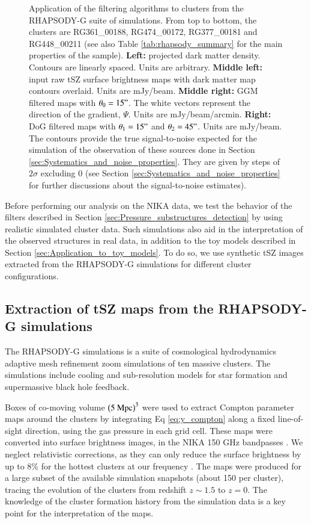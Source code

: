 \documentclass[twocolumn,traditabstract]{aa}
\begin{document}
\begin{figure}[h]
\caption{\footnotesize{Application of the filtering algorithms to clusters from the RHAPSODY-G suite of simulations. From top to bottom, the clusters are RG361\_00188, RG474\_00172, RG377\_00181 and RG448\_00211 (see also Table \ref{tab:rhapsody_summary} for the main properties of the sample). {\bf Left:} projected dark matter density. Contours are linearly spaced. Units are arbitrary. {\bf Middle left:} input raw tSZ surface brightness maps with dark matter map contours overlaid. Units are mJy/beam. {\bf Middle right:} GGM filtered maps with $\theta_0 = 15"$. The white vectors represent the direction of the gradient, $\Psi$. Units are mJy/beam/arcmin. {\bf Right:} DoG filtered maps with $\theta_1 = 15"$ and $\theta_2 = 45"$. Units are mJy/beam. The contours provide the true signal-to-noise expected for the simulation of the observation of these sources done in Section \ref{sec:Systematics_and_noise_properties}. They are given by steps of $2 \sigma$ excluding 0 (see Section \ref{sec:Systematics_and_noise_properties} for further discussions about the signal-to-noise estimates).}}
\label{fig:RG_cluster_sample}
\end{figure}

Before performing our analysis on the NIKA data, we test the behavior of the filters described in Section \ref{sec:Pressure_substructures_detection} by using realistic simulated cluster data. Such simulations also aid in the interpretation of the observed structures in real data, in addition to the toy models described in Section \ref{sec:Application_to_toy_models}. To do so, we use synthetic tSZ images extracted from the RHAPSODY-G simulations for different cluster configurations.

\subsection{Extraction of tSZ maps from the RHAPSODY-G simulations}
The RHAPSODY-G simulations \citep{Wu2013,Hahn2017} is a suite of cosmological hydrodynamics adaptive mesh refinement zoom simulations of ten massive clusters. The simulations include cooling and sub-resolution models for star formation and supermassive black hole feedback. 

Boxes of co-moving volume $\left(5 \ {\rm Mpc}\right)^3$ were used to extract Compton parameter maps around the clusters by integrating Eq \ref{eq:y_compton} along a fixed line-of-sight direction, using the gas pressure in each grid cell. These maps were converted into surface brightness images, in the NIKA 150 GHz bandpasses \citep[see the coefficient provided in][]{Adam2016b}. We neglect relativistic corrections, as they can only reduce the surface brightness by up to 8\% for the hottest clusters at our frequency \citep{Itoh2003}. The maps were produced for a large subset of the available simulation snapshots (about 150 per cluster), tracing the evolution of the clusters from redshift $z \sim 1.5$ to $z=0$. The knowledge of the cluster formation history from the simulation data is a key point for the interpretation of the maps.
\end{document}
